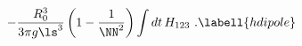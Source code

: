 \begin{equation}
-{R_0^3\over3\pi g\ls^3}\left(1-{1\over \NN^2}\right)\int dt\,H_{123}\ .
\labell{hdipole}
\end{equation}

